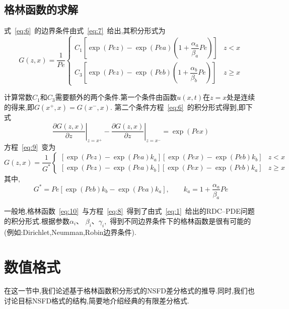 \documentclass[a4paper,cs4size,adobefonts,cm-default,no-math]{ctexart}
\begin{document}
\subsection{格林函数的求解}
式~\ref{eq:6}~的边界条件由式~\ref{eq:7}~给出,其积分形式为
\begin{equation}\label{eq:9}
 G(z,x)=\dfrac{1}{Pe}
 \begin{cases}
 C_1\left[\exp(Pez)-\exp(Pea)\left(1+\dfrac{\alpha_a}{\beta_a}Pe\right)\right] & z<x \\[1.2em]
 C_3\left[\exp(Pez)-\exp(Peb)\left(1+\dfrac{\alpha_b}{\beta_b}Pe\right)\right] & z\geq x 
 \end{cases}
\end{equation}\par
计算常数$C_1$和$C_3$需要额外的两个条件.第一个条件由函数$u(x,t)$在$z=x$处是连续的得来,即$G(x^+,x)=G(x^-,x)$.
第二个条件方程~\ref{eq:6}~的积分形式得到,即下式
\begin{equation*}
 \left.\dfrac{\partial G(z,x)}{\partial z}\right|_{z=x^+}-\left.\dfrac{\partial G(z,x)}{\partial z}\right|_{z=x^-}
 =\exp(Pex)
\end{equation*}
方程~\ref{eq:9}~变为
\begin{equation}\label{eq:10}
 G(z,x)=\dfrac{1}{G^*}
         \begin{cases}
         \left[\exp(Pez)-\exp(Pea)k_a\right]\left[\exp(Pex)-\exp(Peb)k_b\right] & z<x \\
         \left[\exp(Pez)-\exp(Pea)k_b\right]\left[\exp(Pex)-\exp(Peb)k_a\right] & z\geq x
         \end{cases}
\end{equation}
其中,
\begin{equation*}
 G^*=Pe[\exp(Peb)k_b-\exp(Pea)k_a],\qquad k_a=1+\dfrac{\alpha_a}{\beta_a}Pe
\end{equation*}\par
一般地,格林函数~\ref{eq:10}~与方程~\ref{eq:8}~得到了由式~\ref{eq:1}~给出的RDC--PDE问题的积分形式.根据参数$\alpha_i$、
$\beta_i$、$\gamma_i$,~得到不同边界条件下的格林函数是很有可能的(例如:Dirichlet,Neumman,Robin边界条件).
\section{数值格式}
在这一节中,我们论述基于格林函数积分形式的NSFD差分格式的推导.同时,我们也讨论目标NSFD格式的结构,简要地介绍经典的有限差分格式.
\end{document}
